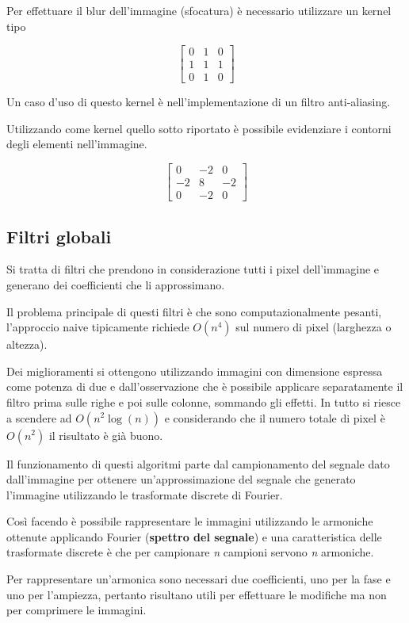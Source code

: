 Per effettuare il blur dell'immagine (sfocatura) è necessario utilizzare
un kernel tipo

$$
 \begin{bmatrix}
 0 & 1 & 0 \\
 1 & 1 & 1 \\
 0 & 1 & 0
 \end{bmatrix}
$$

Un caso d'uso di questo kernel è nell'implementazione di un filtro
anti-aliasing.

Utilizzando come kernel quello sotto riportato è possibile evidenziare i
contorni degli elementi nell'immagine.

$$
\begin{bmatrix}
0 & -2 & 0 \\
-2 & 8 & -2 \\
0 & -2 & 0
\end{bmatrix}
$$

\subsection{Filtri globali}\label{filtri-globali}

Si tratta di filtri che prendono in considerazione tutti i pixel
dell'immagine e generano dei coefficienti che li approssimano.

Il problema principale di questi filtri è che sono computazionalmente
pesanti, l'approccio naive tipicamente richiede $O(n^4)$ sul
numero di pixel (larghezza o altezza).

Dei miglioramenti si ottengono utilizzando immagini con dimensione
espressa come potenza di due e dall'osservazione che è possibile
applicare separatamente il filtro prima sulle righe e poi sulle colonne,
sommando gli effetti. In tutto si riesce a scendere ad $O(n^2\log(n))$  e considerando che il numero totale di pixel è $O(n^2)$ il
risultato è già buono.

Il funzionamento di questi algoritmi parte dal campionamento del segnale
dato dall'immagine per ottenere un'approssimazione del segnale che
generato l'immagine utilizzando le trasformate discrete di Fourier.

Così facendo è possibile rappresentare le immagini utilizzando le
armoniche ottenute applicando Fourier (\textbf{spettro del segnale}) e
una caratteristica delle trasformate discrete è che per campionare
\emph{n} campioni servono \emph{n} armoniche.

Per rappresentare un'armonica sono necessari due coefficienti, uno per
la fase e uno per l'ampiezza, pertanto risultano utili per effettuare
le modifiche ma non per comprimere le immagini.

